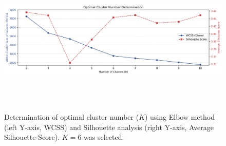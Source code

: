 \documentclass[a4paper,fleqn]{cas-sc}
\begin{document}
\begin{figure}[htbp!]
    \centering
    \includegraphics[width=1\linewidth]{figs/rq1_optimal_clusters_combined.png}
    \caption{Determination of optimal cluster number ($K$) using Elbow method (left Y-axis, WCSS) and Silhouette analysis (right Y-axis, Average Silhouette Score). $K=6$ was selected.}
    \label{fig:rq1_optimal_clusters}
\end{figure}
\end{document}
